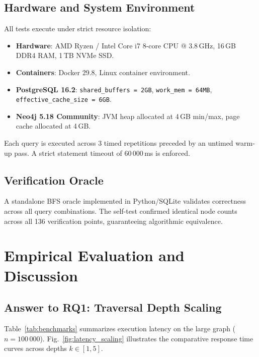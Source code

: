 \documentclass[conference,10pt]{IEEEtran}%
\begin{document}
\subsection{Hardware and System Environment}
All tests execute under strict resource isolation:
\begin{itemize}
    \item \textbf{Hardware}: AMD Ryzen / Intel Core i7 8-core CPU @ 3.8\,GHz, 16\,GB DDR4 RAM, 1\,TB NVMe SSD.
    \item \textbf{Containers}: Docker 29.8, Linux container environment.
    \item \textbf{PostgreSQL 16.2}: \texttt{shared\_buffers = 2GB}, \texttt{work\_mem = 64MB}, \texttt{effective\_cache\_size = 6GB}.
    \item \textbf{Neo4j 5.18 Community}: JVM heap allocated at 4\,GB min/max, page cache allocated at 4\,GB.
\end{itemize}
Each query is executed across 3 timed repetitions preceded by an untimed warm-up pass. A strict statement timeout of $60\,000$\,ms is enforced.

\subsection{Verification Oracle}
A standalone BFS oracle implemented in Python/SQLite validates correctness across all query combinations. The self-test confirmed identical node counts across all 136 verification points, guaranteeing algorithmic equivalence.

\section{Empirical Evaluation and Discussion}

\subsection{Answer to RQ1: Traversal Depth Scaling}
Table~\ref{tab:benchmarks} summarizes execution latency on the large graph ($n = 100\,000$). Fig.~\ref{fig:latency_scaling} illustrates the comparative response time curves across depths $k \in [1, 5]$.
\end{document}
